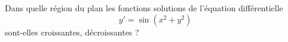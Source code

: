\begin{exercice}\label{exoEquaDiff0006}

Dans quelle région du plan les fonctions solutions de l'équation différentielle
\begin{equation}
	y'=\sin(x^2+y^2)
\end{equation}
 sont-elles croissantes, décroissantes ?

\end{exercice}
